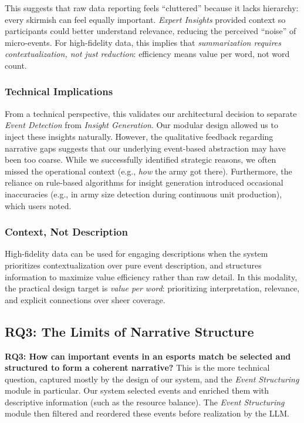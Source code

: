 This suggests that raw data reporting feels ``cluttered'' because it lacks hierarchy: every skirmish can feel equally important. \textit{Expert Insights} provided context so participants could better understand relevance, reducing the perceived ``noise'' of micro-events. For high-fidelity data, this implies that \textit{summarization requires contextualization, not just reduction}: efficiency means value per word, not word count.

\subsubsection{Technical Implications}
From a technical perspective, this validates our architectural decision to separate \textit{Event Detection} from \textit{Insight Generation}. Our modular design allowed us to inject these insights naturally. However, the qualitative feedback regarding narrative gaps suggests that our underlying event-based abstraction may have been too coarse. While we successfully identified strategic reasons, we often missed the operational context (e.g., \textit{how} the army got there). Furthermore, the reliance on rule-based algorithms for insight generation introduced occasional inaccuracies (e.g., in army size detection during continuous unit production), which users noted.

\subsubsection{Context, Not Description}

High-fidelity data can be used for engaging descriptions when the system prioritizes contextualization over pure event description, and structures information to maximize value efficiency rather than raw detail. In this modality, the practical design target is \textit{value per word}: prioritizing interpretation, relevance, and explicit connections over sheer coverage.

\subsection{RQ3: The Limits of Narrative Structure}
\textbf{RQ3: How can important events in an esports match be selected and structured to form a coherent narrative?}
This is the more technical question, captured mostly by the design of our system, and the \textit{Event Structuring} module in particular. Our system selected events and enriched them with descriptive information (such as the resource balance). The \textit{Event Structuring} module then filtered and reordered these events before realization by the LLM.


